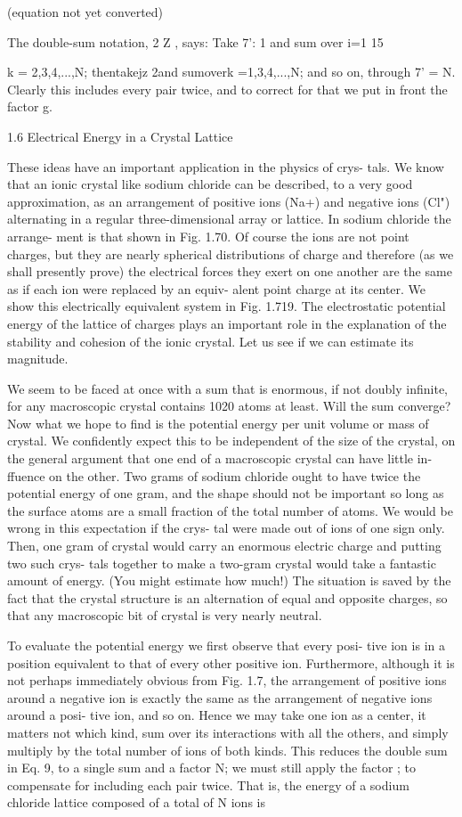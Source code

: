 (equation not yet converted)

The double-sum notation, 2 Z , says: Take 7': 1 and sum over
i=1 15

k = 2,3,4,...,N; thentakejz 2and sumoverk =1,3,4,...,N;
and so on, through 7' = N. Clearly this includes every pair twice, and
to correct for that we put in front the factor g.

1.6 Electrical Energy in a Crystal Lattice

These ideas have an important application in the physics of crys-
tals. We know that an ionic crystal like sodium chloride can be
described, to a very good approximation, as an arrangement of
positive ions (Na+) and negative ions (Cl") alternating in a regular
three-dimensional array or lattice. In sodium chloride the arrange-
ment is that shown in Fig. 1.70. Of course the ions are not point
charges, but they are nearly spherical distributions of charge and
therefore (as we shall presently prove) the electrical forces they exert
on one another are the same as if each ion were replaced by an equiv-
alent point charge at its center. We show this electrically equivalent
system in Fig. 1.719. The electrostatic potential energy of the lattice
of charges plays an important role in the explanation of the stability
and cohesion of the ionic crystal. Let us see if we can estimate its
magnitude.

We seem to be faced at once with a sum that is enormous, if not
doubly infinite, for any macroscopic crystal contains 1020 atoms at
least. Will the sum converge? Now what we hope to find is the
potential energy per unit volume or mass of crystal. We confidently
expect this to be independent of the size of the crystal, on the general
argument that one end of a macroscopic crystal can have little in-
ffuence on the other. Two grams of sodium chloride ought to have
twice the potential energy of one gram, and the shape should not be
important so long as the surface atoms are a small fraction of the total
number of atoms. We would be wrong in this expectation if the crys-
tal were made out of ions of one sign only. Then, one gram of crystal
would carry an enormous electric charge and putting two such crys-
tals together to make a two-gram crystal would take a fantastic
amount of energy. (You might estimate how much!) The situation
is saved by the fact that the crystal structure is an alternation of equal
and opposite charges, so that any macroscopic bit of crystal is very
nearly neutral.

To evaluate the potential energy we first observe that every posi-
tive ion is in a position equivalent to that of every other positive ion.
Furthermore, although it is not perhaps immediately obvious from
Fig. 1.7, the arrangement of positive ions around a negative ion is
exactly the same as the arrangement of negative ions around a posi-
tive ion, and so on. Hence we may take one ion as a center, it matters
not which kind, sum over its interactions with all the others, and
simply multiply by the total number of ions of both kinds. This
reduces the double sum in Eq. 9, to a single sum and a factor N; we
must still apply the factor ; to compensate for including each pair
twice. That is, the energy of a sodium chloride lattice composed of
a total of N ions is

